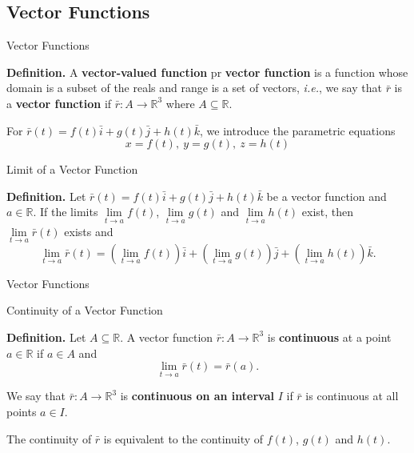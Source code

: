 \documentclass{beamer}
\begin{document}
    \subsection{Vector Functions}
    \begin{frame}[t]{Vector Functions}
        \begin{block}
            \par \textbf{Definition.} A \textbf{vector-valued function} pr \textbf{vector function} is a function whose domain is a subset of the reals and range is a set of vectors, \textit{i.e.}, we say that $\bar{r}$ is a \textbf{vector function} if $\bar{r}: A \to \mathbb{R}^3$ where $A \subseteq \mathbb{R}$.
        \end{block}

        \phantom{zjy}
        
        \par For $\bar{r} (t) = f(t) \bar{i} + g(t) \bar{j} + h(t) \bar{k}$, we introduce the parametric equations 
        \begin{equation*}
            x = f(t),\ y = g(t),\ z = h(t) 
        \end{equation*}

        \begin{block}{Limit of a Vector Function}
            \par \textbf{Definition.} Let $\bar{r}(t) = f(t) \bar{i} + g(t) \bar{j} + h(t) \bar{k}$ be a vector function and $a \in \mathbb{R}$. If the limits $\lim\limits_{t \to a}f(t)$, $\lim\limits_{t \to a}g(t)$ and $\lim\limits_{t \to a}h(t)$ exist, then $\lim\limits_{t \to a} \bar{r} (t)$ exists and 
            \begin{equation*}
                \lim _{t \rightarrow a} \bar{r}(t)=\left(\lim _{t \rightarrow a} f(t)\right) \bar{i}+\left(\lim _{t \rightarrow a} g(t)\right) \bar{j}+\left(\lim _{t \rightarrow a} h(t)\right) \bar{k} .
            \end{equation*}
        \end{block}
    \end{frame}

    \begin{frame}[t]{Vector Functions}
        \begin{block}{Continuity of a Vector Function}
            \par \textbf{Definition.} Let $A \subseteq \mathbb{R}$. A vector function $\bar{r}: A \to \mathbb{R}^3$ is \textbf{continuous} at a point $a \in \mathbb{R}$ if $a \in A$ and 
            \begin{equation*}
                \lim\limits_{t \to a}\bar{r} (t) = \bar{r} (a).
            \end{equation*}

            \phantom{zjy}

            \par We say that $\bar{r}: A \to \mathbb{R}^3$ is \textbf{continuous on an interval} $I$ if $\bar{r}$ is continuous at all points $a \in I$.
            \par The continuity of $\bar{r}$ is equivalent to the continuity of $f(t)$, $g(t)$ and $h(t)$.
        \end{block}
    \end{frame}
\end{document}
